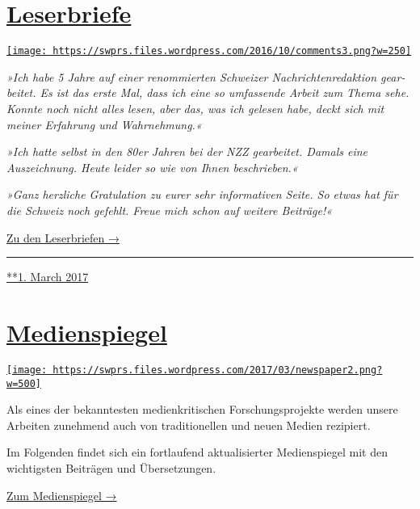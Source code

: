 \hypertarget{leserbriefe}{%
\section{\texorpdfstring{\href{https://swprs.org/2017/03/01/leserbriefe/}{Leserbriefe}}{Leserbriefe}}\label{leserbriefe}}

\href{https://swprs.org/2017/03/01/leserbriefe/}{\texttt{[image: https://swprs.files.wordpress.com/2016/10/comments3.png?w=250]}}

\emph{»Ich habe 5 Jahre auf einer renom­mier­ten Schweizer
Nachrichten­redaktion ge­ar­bei­tet. Es ist das erste Mal, dass ich eine
so umfassende Arbeit zum Thema sehe. Konnte noch nicht alles lesen, aber
das, was ich gelesen habe, deckt sich mit meiner Erfahrung und
Wahr­nehmung.«}

\emph{»Ich hatte selbst in den 80er Jahren bei der NZZ gearbeitet.
Damals eine Auszeichnung. Heute leider so wie von Ihnen beschrieben.«}

\emph{»Ganz herzliche Gratulation zu eurer sehr infor­ma­tiven Seite. So
etwas hat für die Schweiz noch gefehlt. Freue mich schon auf weitere
Beiträge!«}

\href{https://swprs.org/leserbriefe/}{Zu den Leserbriefen →}

\begin{center}\rule{0.5\linewidth}{\linethickness}\end{center}

\href{https://swprs.org/2017/03/01/leserbriefe/}{**1. March 2017}

\hypertarget{medienspiegel}{%
\section{\texorpdfstring{\href{https://swprs.org/2017/03/01/medienspiegel/}{Medienspiegel}}{Medienspiegel}}\label{medienspiegel}}

\href{https://swprs.org/2017/03/01/medienspiegel/}{\texttt{[image: https://swprs.files.wordpress.com/2017/03/newspaper2.png?w=500]}}

Als eines der bekanntesten medien­kritischen Forschungs­projekte werden
unsere Arbeiten zunehmend auch von tradi­tio­nellen und neuen Medien
rezipiert.

Im Folgenden findet sich ein fort­laufend aktuali­sierter Medien­spiegel
mit den wich­tig­sten Beiträgen und Übersetzungen.

\href{https://swprs.org/medienspiegel/}{Zum Medienspiegel →}

